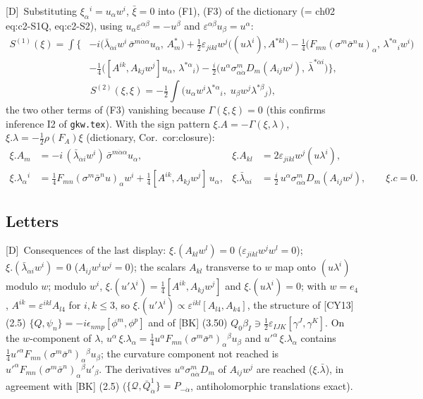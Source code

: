 \documentclass[11pt]{article}
\theoremstyle{definition}
\newcommand{\Dl}{\textup{[D]}}
\begin{document}
\Dl\ Substituting $\xi_\alpha{}^i=u_\alpha w^i$, $\bar\xi=0$ into (F1), (F3) of the dictionary (= ch02 eq:c2-S1Q, eq:c2-S2), using $u_\alpha\varepsilon^{\alpha\beta}=-u^\beta$ and $\varepsilon^{\alpha\beta}u_\beta=u^\alpha$:
\begin{align*}
S^{(1)}(\xi)=\int\Big\{&-i\big(\bar\lambda_{\dot\alpha i}w^i\,\bar\sigma^{m\dot\alpha\alpha}u_\alpha,\,A^*_m\big)+\tfrac12\varepsilon_{jikl}w^j\big((u\lambda^i),A^{*kl}\big)
-\tfrac14\big(F_{mn}(\sigma^m\bar\sigma^nu)_\alpha,\,\lambda^{*\alpha}{}_iw^i\big)\\
&-\tfrac14\big([A^{ik},A_{kj}w^j]u_\alpha,\,\lambda^{*\alpha}{}_i\big)-\tfrac i2\big(u^\alpha\sigma^m_{\alpha\dot\alpha}D_m(A_{ij}w^j),\,\bar\lambda^{*\dot\alpha i}\big)\Big\},
\end{align*}
\[
S^{(2)}(\xi,\xi)=-\tfrac12\int\big(u_\alpha w^i\lambda^{*\alpha}{}_i,\;u_\beta w^j\lambda^{*\beta}{}_j\big),
\]
the two other terms of (F3) vanishing because $\Gamma(\xi,\xi)=0$ (this confirms inference I2 of \texttt{gkw.tex}). With the sign pattern $\xi.A=-\Gamma(\xi,\lambda)$, $\xi.\lambda=-\tfrac12\rho(F_A)\xi$ (dictionary, Cor.~cor:closure):
\begin{align*}
\xi.A_m&=-i\,(\bar\lambda_{\dot\alpha i}w^i)\,\bar\sigma^{m\dot\alpha\alpha}u_\alpha, &
\xi.A_{kl}&=2\varepsilon_{jikl}w^j(u\lambda^i),\\
\xi.\lambda_\alpha{}^i&=\tfrac14F_{mn}(\sigma^m\bar\sigma^nu)_\alpha w^i+\tfrac14[A^{ik},A_{kj}w^j]\,u_\alpha, &
\xi.\bar\lambda_{\dot\alpha i}&=\tfrac i2\,u^\alpha\sigma^m_{\alpha\dot\alpha}D_m(A_{ij}w^j),\qquad \xi.c=0 .
\end{align*}

\subsection{Letters}

\Dl\ Consequences of the last display: $\xi.(A_{kl}w^l)=0$ ($\varepsilon_{jikl}w^jw^l=0$); $\xi.(\bar\lambda_{\dot\alpha i}w^i)=0$ ($A_{ij}w^iw^j=0$); the scalars $A_{kl}$ transverse to $w$ map onto $(u\lambda^i)$ modulo $w$; modulo $w^i$, $\xi.(u'\lambda^i)=\tfrac14[A^{ik},A_{kj}w^j]$ and $\xi.(u\lambda^i)=0$; with $w=e_4$, $A^{ik}=\varepsilon^{ikl}A_{l4}$ for $i,k\le3$, so $\xi.(u'\lambda^i)\propto\varepsilon^{ikl}[A_{l4},A_{k4}]$, the structure of [CY13] (2.5) $\{Q,\psi_n\}=-i\epsilon_{nmp}[\phi^m,\phi^p]$ and of [BK] (3.50) $Q_0\beta_I\ni\tfrac12\varepsilon_{IJK}[\gamma^J,\gamma^K]$. On the $w$-component of $\lambda$, $u^\alpha\,\xi.\lambda_\alpha=\tfrac14u^\alpha F_{mn}(\sigma^m\bar\sigma^n)_\alpha{}^\beta u_\beta$ and $u'^\alpha\,\xi.\lambda_\alpha$ contains $\tfrac14u'^\alpha F_{mn}(\sigma^m\bar\sigma^n)_\alpha{}^\beta u_\beta$; the curvature component not reached is $u'^\alpha F_{mn}(\sigma^m\bar\sigma^n)_\alpha{}^\beta u'_\beta$. The derivatives $u^\alpha\sigma^m_{\alpha\dot\alpha}D_m$ of $A_{ij}w^j$ are reached ($\xi.\bar\lambda$), in agreement with [BK] (2.5) ($\{\mathcal Q,\bar Q^1_{\dot\alpha}\}=P_{-\dot\alpha}$, antiholomorphic translations exact).
\end{document}
